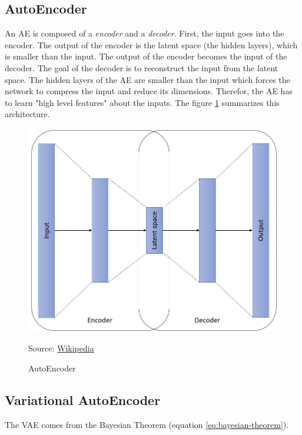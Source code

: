 \documentclass[12pt]{report}
\begin{document}
\subsection{AutoEncoder}
\label{sec:back:ae}

An AE \cite{moor_topological_2020, tschannen_recent_2018, rudolph_structuring_2019} is composed of a \textit{encoder} and a \textit{decoder}.
First, the input goes into the encoder.
The output of the encoder is the latent space (the hidden layers), which is smaller than the input.
The output of the encoder becomes the input of the decoder.
The goal of the decoder is to reconstruct the input from the latent space.
The hidden layers of the AE are smaller than the input which forces the network to compress the input and reduce its dimensions.
Therefor, the AE has to learn "high level features" about the inputs.
The figure \ref{fig:autoencoder} summarizes this architecture.

\begin{figure}[H]
    \centering
    \includegraphics[width=0.9 \textwidth]{images/nn/architectures/autoencoder.jpg}
    \caption{AutoEncoder}
    Source: \href{https://commons.wikimedia.org/wiki/File:Autoencoder_structure.png}{Wikipedia}
    \label{fig:autoencoder}
\end{figure}

\subsection{Variational AutoEncoder}
\label{sec:back:vae}

The VAE \cite{doersch_tutorial_2016, noauthor_variational_nodate, noauthor_tutorial_nodate, akrami_robust_2019, liu_towards_2020} comes from the Bayesian Theorem (equation \ref{eq:bayesian-theorem}).
\end{document}
